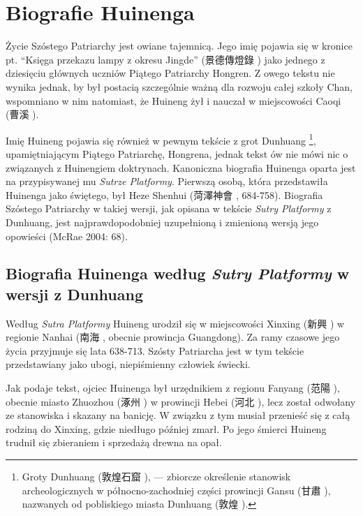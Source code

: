 \chapter{Biografie Huinenga}
Życie Szóstego Patriarchy jest owiane tajemnicą. Jego imię pojawia się w kronice pt. ``Księga przekazu lampy z okresu Jingde'' (景德傳燈錄 ) jako jednego z dziesięciu głównych uczniów Piątego Patriarchy Hongren.
Z owego tekstu nie wynika jednak, by był postacią szczególnie ważną dla rozwoju całej szkoły Chan, wspomniano w nim natomiast, że Huineng żył i nauczał w miejscowości Caoqi (曹溪 ).

Imię Huineng pojawia się również w pewnym tekście z grot Dunhuang%
\footnote{Groty Dunhuang (敦煌石窟 ), --- zbiorcze określenie stanowisk archeologicznych w północno-zachodniej części prowincji Gansu (甘肅 ), nazwanych od pobliskiego miasta Dunhuang (敦煌 ).},
upamiętniającym Piątego Patriarchę, Hongrena, jednak tekst ów nie mówi nic o związanych z Huinengiem doktrynach.
Kanoniczna biografia Huinenga oparta jest na przypisywanej mu \textit{Sutrze Platformy}. Pierwszą osobą, która przedstawiła Huinenga jako świętego, był Heze Shenhui (菏澤神會 , 684-758).
Biografia Szóstego Patriarchy w takiej wersji, jak opisana w tekście \textit{Sutry Platformy} z Dunhuang, jest najprawdopodobniej uzupełnioną i zmienioną wersją jego opowieści (McRae 2004: 68).

\section{Biografia Huinenga według \textit{Sutry Platformy} w wersji z Dunhuang}
Według \textit{Sutra Platformy} Huineng urodził się w miejscowości Xinxing (新興 ) w regionie Nanhai (南海 , obecnie prowincja Guangdong). Za ramy czasowe jego życia przyjmuje się lata 638-713. Szósty Patriarcha jest w tym tekście przedstawiany jako ubogi, niepiśmienny człowiek świecki.

Jak podaje tekst, ojciec Huinenga był urzędnikiem z regionu Fanyang (范陽 ), obecnie miasto Zhuozhou (涿州 ) w prowincji Hebei (河北 ), lecz został odwołany ze stanowiska i skazany na banicję.
W związku z tym musiał przenieść się z całą rodziną do Xinxing, gdzie niedługo później zmarł. Po jego śmierci Huineng trudnił się zbieraniem i sprzedażą drewna na opał.

